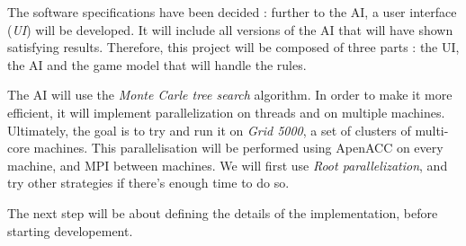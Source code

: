 The software specifications have been decided : further to the AI, a user interface (\emph{UI}) will be developed.
It will include all versions of the AI that will have shown satisfying results.
Therefore, this project will be composed of three parts : the UI, the AI and the game model that will handle the rules.

The AI will use the \emph{Monte Carle tree search} algorithm.
In order to make it more efficient, it will implement parallelization on threads and on multiple machines.
Ultimately, the goal is to try and run it on \emph{Grid 5000}, a set of clusters of multi-core machines.
This parallelisation will be performed using ApenACC on every machine, and MPI between machines.
We will first use \emph{Root parallelization}, and try other strategies if there's enough time to do so.

The next step will be about defining the details of the implementation, before starting developement.